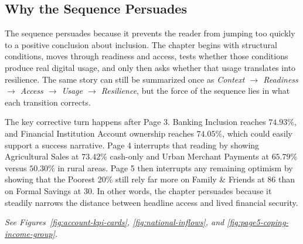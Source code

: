 \documentclass[../main.tex]{subfiles}
\begin{document}
\subsection{Why the Sequence Persuades}
\label{subsec:story-structure}

The sequence persuades because it prevents the reader from jumping too quickly
to a positive conclusion about inclusion. The chapter begins with structural
conditions, moves through readiness and access, tests whether those conditions
produce real digital usage, and only then asks whether that usage translates
into resilience. The same story can still be summarized once as
\textit{Context \(\rightarrow\) Readiness \(\rightarrow\) Access \(\rightarrow\)
Usage \(\rightarrow\) Resilience}, but the force of the sequence lies in what
each transition corrects.

The key corrective turn happens after Page 3. Banking Inclusion reaches
\(74.93\%\), and Financial Institution Account ownership reaches \(74.05\%\),
which could easily support a success narrative. Page 4 interrupts that reading
by showing Agricultural Sales at \(73.42\%\) cash-only and Urban Merchant
Payments at \(65.79\%\) versus \(50.30\%\) in rural areas. Page 5 then
interrupts any remaining optimism by showing that the Poorest 20\% still rely
far more on Family \& Friends at 86 than on Formal Savings at 30. In other
words, the chapter persuades because it steadily narrows the distance between
headline access and lived financial security.

\noindent\textit{See Figures~\ref{fig:account-kpi-cards},
\ref{fig:national-inflows}, and
\ref{fig:page5-coping-income-group}.}
\end{document}
